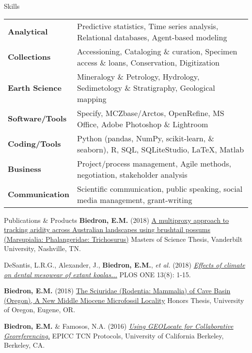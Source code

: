 \documentclass{resume} %
\begin{document}
\begin{rSection}{Skills}	
	\begin{tabular}{ @{} >{\bfseries}l @{\hspace{4ex}} l }	
		Analytical & Predictive statistics, Time series analysis,  Relational databases, Agent-based modeling \\
		Collections & Accessioning, Cataloging \& curation, Specimen access \& loans, Conservation, Digitization \\
		Earth Science & Mineralogy \& Petrology, Hydrology, Sedimetology \& Stratigraphy, Geological mapping\\
		Software/Tools & Specify, MCZbase/Arctos, OpenRefine, MS Office, Adobe Photoshop \& Lightroom \\
		Coding/Tools & Python (pandas, NumPy, scikit-learn, \& seaborn), R, SQL, SQLiteStudio,  \LaTeX, Matlab \\
		Business & Project/process management, Agile methods, negotiation, stakeholder analysis \\
		Communication & Scientific communication, public speaking, social media management, grant-writing \\
		
	\end{tabular}		
\end{rSection}

	\begin{rSection}{Publications \& Products}
		{\bf Biedron, E.M.} (2018) \href{https://etd.library.vanderbilt.edu/etd-07202018-135518}{A multiproxy approach to tracking aridity across Australian landscapes using brushtail possums (Marsupialia: Phalangeridae: Trichosurus)} Masters of Science Thesis, Vanderbilt University, Nashville, TN.
			
		DeSantis, L.R.G., Alexander, J., {\bf Biedron, E.M.}, {\em et al.} (2018) \href{10.1371/journal.pone.0201962}{\em Effects of climate on dental mesowear of extant koalas...} PLOS ONE 13(8): 1-15.
		
		{\bf Biedron, E.M.} (2018) \href{https://scholarsbank.uoregon.edu/xmlui/handle/1794/20264}{The Sciuridae (Rodentia: Mammalia) of Cave Basin (Oregon), A New Middle Miocene Microfossil Locality} Honors Thesis, University of Oregon, Eugene, OR.
		
		{\bf Biedron, E.M.} \& Famosos, N.A. (2016) \href{https://epicc.berkeley.edu/wp-content/uploads/2015/11/UsingGeoLocateforCollaborativeGeoreferencing\_2016.pdf}{\em Using GEOLocate for Collaborative Georeferencing.} EPICC TCN Protocols, University of California Berkeley, Berkeley, CA.
	\end{rSection}
	
\end{document}

